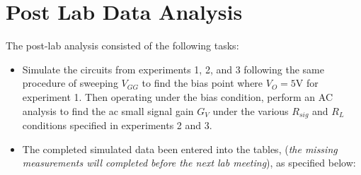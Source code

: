 \section{Post Lab Data Analysis}

The post-lab analysis consisted of the following tasks:

\begin{itemize}

\item Simulate the circuits from experiments 1, 2, and 3 following the same procedure of sweeping $V_{GG}$ to find the bias point where $V_{O} = 5$V for experiment 1. Then operating under the bias condition, perform an AC analysis to find the ac small signal gain $G_{V}$ under the various $R_{sig}$ and $R_{L}$ conditions specified in experiments 2 and 3. 
\item The completed simulated data been entered into the tables, (\emph{the missing measurements will completed before the next lab meeting}), as specified below:
	
\end{itemize}

